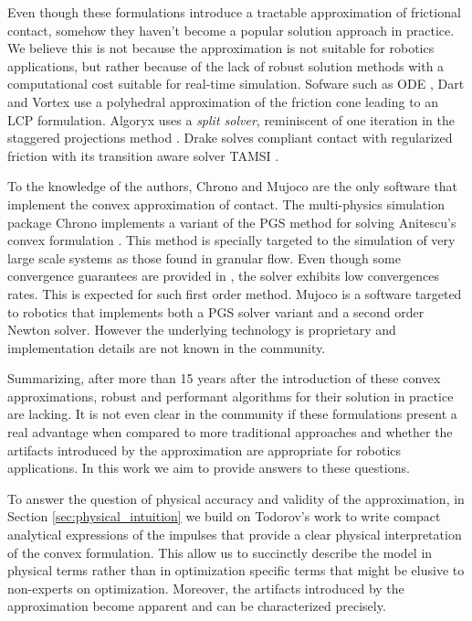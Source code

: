 Even though these formulations introduce a tractable approximation of frictional
contact, somehow they haven't become a popular solution approach in practice. We
believe this is not because the approximation is not suitable for robotics
applications, but rather because of the lack of robust solution methods with a
computational cost suitable for real-time simulation. Sofware such as ODE
\cite{bib:ode}, Dart \cite{bib:dart} and Vortex \cite{bib:vortex} use a
polyhedral approximation of the friction cone leading to an LCP formulation.
Algoryx \cite{bib:algoryx} uses a \emph{split solver}, reminiscent of one
iteration in the staggered projections method \cite{bib:Kaufman2008}. Drake
\cite{bib:drake} solves compliant contact with regularized friction with its
transition aware solver TAMSI \cite{bib:castro2020}. 

To the knowledge of the authors, Chrono \cite{bib:hrono2016} and Mujoco
\cite{bib:mujoco} are the only software that implement the convex approximation
of contact. The multi-physics simulation package Chrono
implements a variant of the PGS method for solving Anitescu's convex formulation
\cite{bib:tasora2011}. This method is specially targeted to the simulation of
very large scale systems as those found in granular flow. Even though some
convergence guarantees are provided in \cite{bib:anitescu2010}, the solver
exhibits low convergences rates. This is expected for such first order method.
Mujoco is a software targeted to robotics that implements both a PGS solver
variant \cite{bib:todorov2014} and a second order Newton solver. However the
underlying technology is proprietary and implementation details are not known in
the community.

Summarizing, after more than 15 years after the introduction of these convex
approximations, robust and performant algorithms for their solution in practice
are lacking. It is not even clear in the community if these formulations present
a real advantage when compared to more traditional approaches and whether the
artifacts introduced by the approximation are appropriate for robotics
applications. In this work we aim to provide answers to these questions. 

To answer the question of physical accuracy and validity of the approximation,
in Section \ref{sec:physical_intuition} we build on Todorov's work
\cite{bib:todorov2014} to write compact analytical expressions of the impulses
that provide a clear physical interpretation of the convex formulation. This
allow us to succinctly describe the model in physical terms rather than in
optimization specific terms that might be elusive to non-experts on optimization. Moreover, the artifacts introduced by the approximation become apparent and can be characterized precisely.



